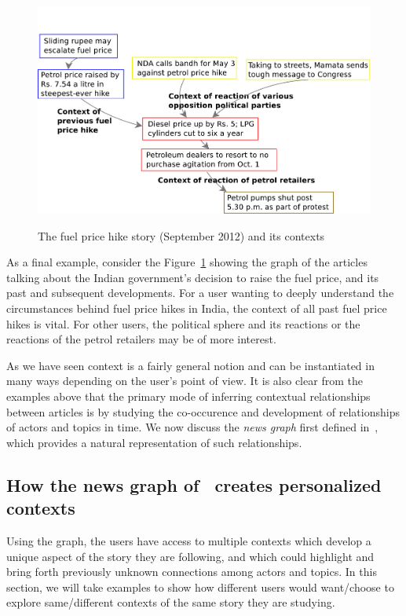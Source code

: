 \begin{figure}
\caption{The fuel price hike story (September 2012) and its contexts}
\includegraphics[scale=0.32]{figures/graph-petrol.pdf}
\label{fig:petrol}
\end{figure}

As a final example, consider the Figure~\ref{fig:petrol} showing the graph of the articles talking
about the Indian government's decision to raise the fuel price, and its past and subsequent developments. 
For a user wanting to deeply understand the circumstances behind fuel price hikes in India, the context of 
all past fuel price hikes is vital. For other users, the political
sphere and its reactions or the reactions of the petrol retailers may be of more interest.

As we have seen context is a fairly general notion and can be
instantiated in many ways depending on the user's point of view. It is
also clear from the examples above that the primary mode of inferring
contextual relationships between articles is by studying the
co-occurence and development of relationships of actors and topics in
time. We now discuss the {\em news graph} first defined
in~\cite{choudhary@ecir2008}, which provides a natural representation
of such relationships.


\subsection{How the news graph of~\cite{choudhary@ecir2008} creates personalized contexts}
Using the graph, the users have access to multiple contexts which
develop a unique aspect of the story they are following, and which
could highlight and bring forth previously unknown connections among
actors and topics. In this section, we will take examples to show how
different users would want/choose to explore same/different contexts
of the same story they are studying.

